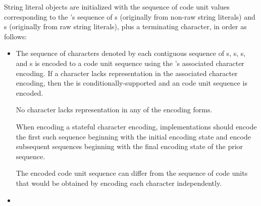 \documentclass{wg21}
\newcommand{\replaceucs}{\changed{UCS}{Unicode}}
\begin{document}
\pnum
{}%
%
%
String literal objects are initialized with
the sequence of code unit values
corresponding to the 's sequence of
s (originally from non-raw string literals) and
s (originally from raw string literals),
plus a terminating  character,
in order as follows:
\begin{itemize}
    \item
    The sequence of characters denoted by each contiguous sequence of
    s,
    s,
    s, and
    s
    is encoded to a code unit sequence
    using the 's associated character encoding.
    If a character lacks representation in the associated character encoding,
    then the  is conditionally-supported and
    an
    code unit sequence is encoded.
    \begin{note}
        No character lacks representation in any of the \replaceucs{} encoding forms.
    \end{note}
    When encoding a stateful character encoding,
    implementations should encode the first such sequence
    beginning with the initial encoding state and
    encode subsequent sequences
    beginning with the final encoding state of the prior sequence.
    \begin{note}
        The encoded code unit sequence can differ from
        the sequence of code units that would be obtained by
        encoding each character independently.
    \end{note}
    \item
\end{itemize}
\end{document}
